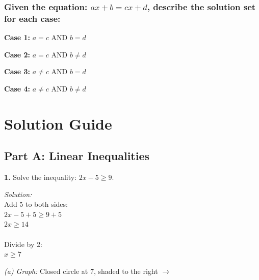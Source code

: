 \documentclass[12pt]{article}
\begin{document}
                \vspace{0.5cm}

            \subsubsection*{Given the equation: $ax + b = cx + d$, describe the solution set for each case:}

                \textbf{Case 1:} $a = c$ AND $b = d$
                
                \vspace{0.5cm}
                
                \textbf{Case 2:} $a = c$ AND $b \neq d$
                
                \vspace{0.5cm}
                
                \textbf{Case 3:} $a \neq c$ AND $b = d$
                
                \vspace{0.5cm}
                
                \textbf{Case 4:} $a \neq c$ AND $b \neq d$
                
                \vspace{0.5cm}

                \newpage

    \section*{Solution Guide}

        \subsection*{Part A: Linear Inequalities}

            \textbf{1.} Solve the inequality: $2x - 5 \geq 9$.

                \textit{Solution:}\\
                Add 5 to both sides:\\
                $2x - 5 + 5 \geq 9 + 5$\\
                $2x \geq 14$\\
                \\
                Divide by 2:\\
                $x \geq 7$

                \textit{(a) Graph:} Closed circle at 7, shaded to the right $\rightarrow$
\end{document}
